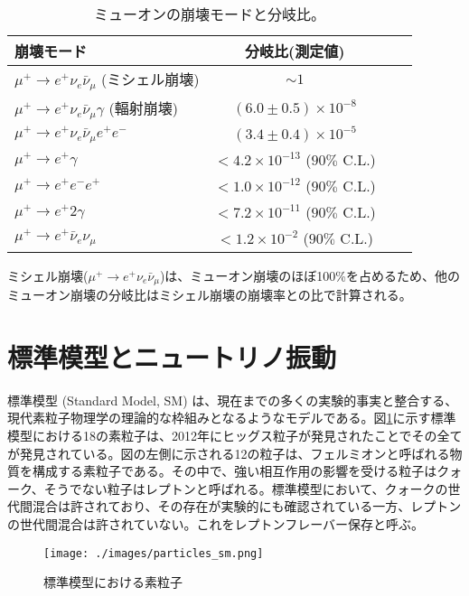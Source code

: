 \documentclass[Yonemoto_master.tex]{subfiles}
\begin{document}
\begin{table}[h]
 \centering
 \caption{ミューオンの崩壊モードと分岐比\cite{muon}。}
 \label{tab: Mu_mode}
  \begin{tabular}{lccc}
   \hline
   崩壊モード & 分岐比(測定値)\\
   \hline \hline
   $\mu^+ \to e^+\nu_e\bar{\nu}_{\mu}$ (ミシェル崩壊)& $\sim 1$ \\
   $\mu^+ \to e^+\nu_e\bar{\nu}_{\mu}\gamma$ (輻射崩壊)& $(6.0 \pm 0.5) \times 10^{-8} $ \\
   $\mu^+ \to e^+\nu_e\bar{\nu}_{\mu}e^+e^- $ & $(3.4 \pm 0.4) \times 10^{-5} $ \\
   \hline
   $\mu^+ \to e^+\gamma$ & $< 4.2 \times 10^{-13}$ ($90 \%$ C.L.)\\
   $\mu^+ \to e^+e^-e^+$ & $< 1.0 \times 10^{-12} $ ($90 \%$ C.L.)\\
   $\mu^+ \to e^+2\gamma$ & $< 7.2 \times 10^{-11}$ ($90 \%$ C.L.)\\
   $\mu^+ \to e^+\bar{\nu}_e\nu_{\mu}$ & $< 1.2 \times 10^{-2} $ ($90 \%$ C.L.)\\
   \hline
  \end{tabular}
\end{table}

ミシェル崩壊($\mu^+ \to e^+\nu_e\bar{\nu}_{\mu}$)は、ミューオン崩壊のほぼ100\%を占めるため、他のミューオン崩壊の分岐比はミシェル崩壊の崩壊率との比で計算される。%

\section{標準模型とニュートリノ振動}
標準模型 (Standard Model, SM) は、現在までの多くの実験的事実と整合する、現代素粒子物理学の理論的な枠組みとなるようなモデルである。図\ref{fig: sm_par}に示す標準模型における18の素粒子は、2012年にヒッグス粒子が発見されたことでその全てが発見されている。図の左側に示される12の粒子は、フェルミオンと呼ばれる物質を構成する素粒子である。その中で、強い相互作用の影響を受ける粒子はクォーク、そうでない粒子はレプトンと呼ばれる。標準模型において、クォークの世代間混合は許されており、その存在が実験的にも確認されている一方、レプトンの世代間混合は許されていない。これをレプトンフレーバー保存と呼ぶ。

\begin{figure}[h]
\begin{center}
\texttt{[image: ./images/particles\_sm.png]}
\caption{標準模型における素粒子 \cite{particles_sm}}
\label{fig: sm_par}
\end{center}
\end{figure}
\end{document}
